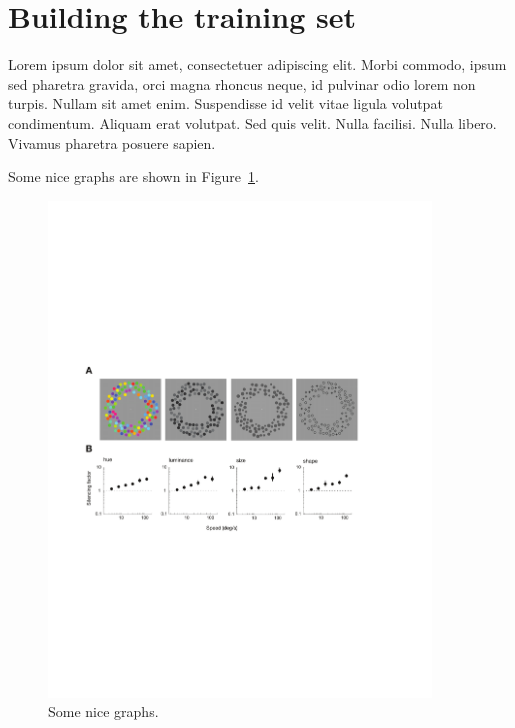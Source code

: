 \section{Building the training set}

    
Lorem ipsum dolor sit amet, consectetuer adipiscing elit. Morbi commodo, ipsum sed pharetra gravida, orci magna rhoncus neque, id pulvinar odio lorem non turpis. Nullam sit amet enim. Suspendisse id velit vitae ligula volutpat condimentum. Aliquam erat volutpat. Sed quis velit. Nulla facilisi. Nulla libero. Vivamus pharetra posuere sapien. 

Some nice graphs are shown in Figure~\ref{fig:label2}.

\begin{figure}[htbp]
\begin{center}
\includegraphics[width=4in]{figures/fig1.pdf}
\caption{Some nice graphs.}
\label{fig:label2}
\end{center}
\end{figure}